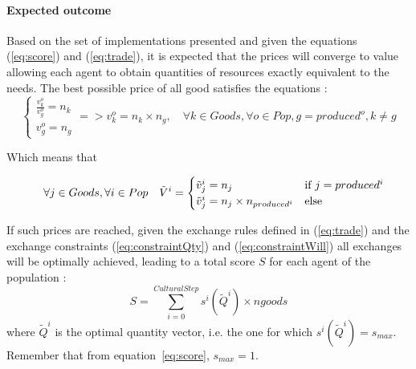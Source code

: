 \documentclass{wscpaperproc}
\begin{document}
\paragraph{Expected outcome} 

Based on the set of implementations presented and given the equations (\ref{eq:score}) and (\ref{eq:trade}), it is expected that the prices will converge to value allowing each agent to obtain quantities of resources exactly equivalent to the needs. The best possible price of all good satisfies the equations :
\begin{equation}
	\begin{cases}
		\frac{v^o_k}{v^o_g} = n_k \\
		v^o_g = n_g 
	\end{cases} =>v^o_k = n_k \times n_g, \quad \forall k \in Goods, \forall o \in Pop, g = produced^o, k \not= g 
\end{equation}

Which means that 

\begin{equation}
	\quad \forall j \in Goods, \forall i \in Pop \quad \tilde{V}^i = 
	\begin{cases}
		\tilde{v}^i_j = n_j & \text{if $ j=produced^i$}\\
		 \tilde{v}^i_j = n_j \times n_{produced^i} & \text{else}
	\end{cases}\label{eq:optimum}
\end{equation}


If such prices are reached, given the exchange rules defined in (\ref{eq:trade}) and the exchange constraints (\ref{eq:constraintQty}) and (\ref{eq:constraintWill}) all exchanges will be optimally achieved, leading to a total score $S$ for each agent of the population : 
$$ S = \sum_{i=0}^{CulturalStep}  s^i(\tilde{Q}^i) \times ngoods $$ 
where $\tilde{Q}^i$ is the optimal quantity vector, i.e. the one for which $s^i(\tilde{Q}^i) = s_{max}$. Remember that from equation~\ref{eq:score}, $s_{max}=1$.
\end{document}
